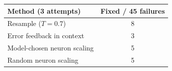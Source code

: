 \begin{tabular}{lc}
\toprule
Method (3 attempts) & Fixed / 45 failures \\
\midrule
Resample ($T{=}0.7$) & 8 \\
Error feedback in context & 3 \\
Model-chosen neuron scaling & 5 \\
Random neuron scaling & 5 \\
\bottomrule
\end{tabular}
